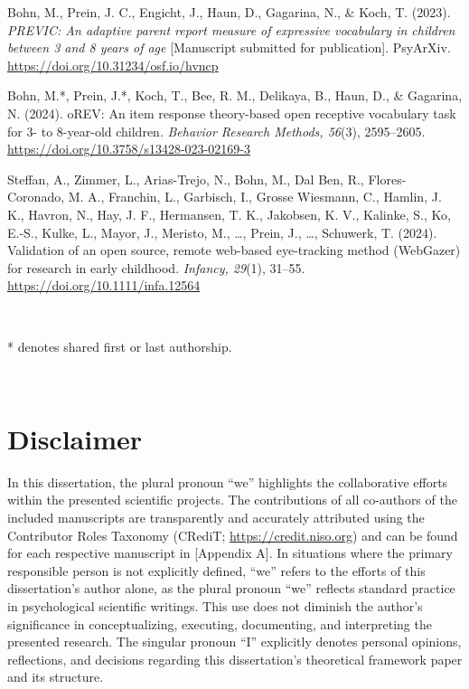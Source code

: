 \documentclass[
]{scrbook}
\begin{document}
Bohn, M., Prein, J. C., Engicht, J., Haun, D., Gagarina, N., \& Koch, T. (2023). \emph{PREVIC: An adaptive parent report measure of expressive vocabulary in children between 3 and 8 years of age} {[}Manuscript submitted for publication{]}. PsyArXiv. \url{https://doi.org/10.31234/osf.io/hvncp}

Bohn, M.*, Prein, J.*, Koch, T., Bee, R. M., Delikaya, B., Haun, D., \& Gagarina, N. (2024). oREV: An item response theory-based open receptive vocabulary task for 3- to 8-year-old children. \emph{Behavior Research Methods, 56}(3), 2595--2605. \url{https://doi.org/10.3758/s13428-023-02169-3}

Steffan, A., Zimmer, L., Arias-Trejo, N., Bohn, M., Dal Ben, R., Flores-Coronado, M. A., Franchin, L., Garbisch, I., Grosse Wiesmann, C., Hamlin, J. K., Havron, N., Hay, J. F., Hermansen, T. K., Jakobsen, K. V., Kalinke, S., Ko, E.-S., Kulke, L., Mayor, J., Meristo, M., \ldots, Prein, J., \ldots, Schuwerk, T. (2024). Validation of an open source, remote web-based eye-tracking method (WebGazer) for research in early childhood. \emph{Infancy, 29}(1), 31--55. \url{https://doi.org/10.1111/infa.12564}

~

* denotes shared first or last authorship.

~
~
~
~

\begingroup
\renewcommand{\cleardoublepage}{}
\renewcommand{\clearpage}{}

\chapter{Disclaimer}\label{disclaimer}

In this dissertation, the plural pronoun ``we'' highlights the collaborative efforts within the presented scientific projects. The contributions of all co-authors of the included manuscripts are transparently and accurately attributed using the Contributor Roles Taxonomy (CRediT; \url{https://credit.niso.org}) and can be found for each respective manuscript in {[}Appendix A{]}. In situations where the primary responsible person is not explicitly defined, ``we'' refers to the efforts of this dissertation's author alone, as the plural pronoun ``we'' reflects standard practice in psychological scientific writings. This use does not diminish the author's significance in conceptualizing, executing, documenting, and interpreting the presented research. The singular pronoun ``I'' explicitly denotes personal opinions, reflections, and decisions regarding this dissertation's theoretical framework paper and its structure.
\endgroup
\end{document}
